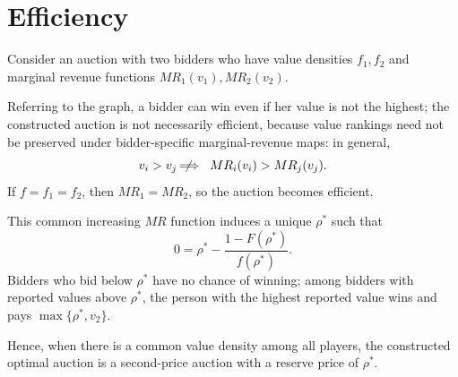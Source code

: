 \section{Efficiency}
Consider an auction with two bidders who have value densities $f_1,f_2$ and marginal revenue functions $MR_1(v_1), MR_2(v_2)$. 

Referring to the graph, a bidder can win even if her value is not the highest; the constructed auction is not necessarily efficient, because value rankings need not be preserved under bidder-specific marginal-revenue maps: in general,
\[
    v_i > v_j \;\not\!\!\!\!\implies\; MR_i(v_i) > MR_j(v_j)
.\]
If $f = f_1 = f_2$, then $MR_1 = MR_2$, so the auction becomes efficient.

This common increasing $MR$ function induces a unique $\rho^*$ such that \[
	0= \rho^* - \frac{1-F(\rho^*)}{f(\rho^*)}
.\] Bidders who bid below $\rho^*$ have no chance of winning; among bidders with reported values above $\rho^*$, the person with the highest reported value wins and pays $\max\{\rho^*, v_2\}$.

Hence, when there is a common value density among all players, the constructed optimal auction is a second-price auction with a reserve price of $\rho^*$.
